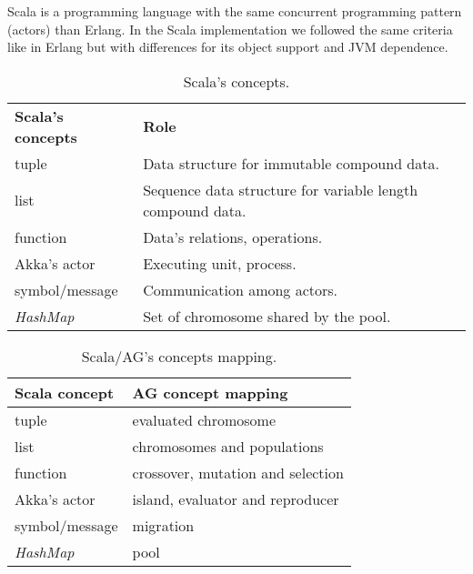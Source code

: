 
Scala is a programming language with the same concurrent programming pattern (actors) than Erlang. In the Scala implementation we followed the same criteria like in Erlang but with differences for its object support and JVM dependence.


\begin{table}[h!]
  \centering
   \caption{Scala's concepts.}\label{sclConstructions}
\begin{tabular}{|>{\centering}p{3.4cm}|p{7cm}|}
  \hline
  \textbf{Scala's concepts} & \textbf{Role} \tabularnewline
  tuple & Data structure for immutable compound data. \tabularnewline
    \hline
 list & Sequence data structure for variable length compound data.
 \tabularnewline
    \hline
 function & Data's relations, operations. \tabularnewline
     \hline
    Akka's actor & Executing unit, process. \tabularnewline
     \hline
  symbol/message & Communication among actors. \tabularnewline
     \hline
  {\em HashMap} & Set of chromosome shared by the pool. \tabularnewline
     \hline
\end{tabular}

\end{table}

\begin{table}
  \centering
  \caption{Scala/AG's concepts mapping.}\label{sclAGRelation}
\begin{tabular}{|>{\centering}p{3cm}|p{6cm}|}
  \hline
  \textbf{Scala concept} & \textbf{AG concept mapping} \tabularnewline
  \hline
   tuple & evaluated chromosome \tabularnewline
    \hline
 list & chromosomes and populations \tabularnewline
    \hline
 function & crossover, mutation and selection \tabularnewline
    \hline
  Akka's actor & island, evaluator and reproducer \tabularnewline
     \hline
  symbol/message & migration \tabularnewline
     \hline
  {\em HashMap} & pool \tabularnewline
     \hline
\end{tabular}

\end{table}






